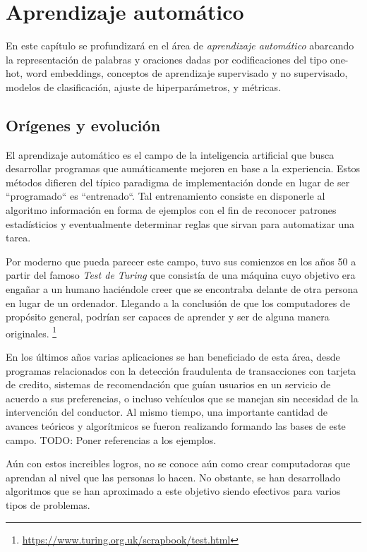 \chapter{Aprendizaje automático}

En este capítulo se profundizará en el área de \emph{aprendizaje automático}
abarcando la representación de palabras y oraciones dadas por codificaciones del
tipo one-hot, word embeddings, conceptos de aprendizaje supervisado y no
supervisado, modelos de clasificación, ajuste de hiperparámetros, y métricas.

\section{Orígenes y evolución}

El aprendizaje automático es el campo de la inteligencia artificial que busca
desarrollar programas que aumáticamente mejoren en base a la experiencia. Estos
métodos difieren del típico paradigma de implementación donde en lugar de ser
``programado`` es ``entrenado``. Tal entrenamiento consiste en disponerle al
algoritmo información en forma de ejemplos con el fin de reconocer patrones
estadísticios y eventualmente determinar reglas que sirvan para automatizar una
tarea.

Por moderno que pueda parecer este campo, tuvo sus comienzos en los años 50 a
partir del famoso \emph{Test de Turing} que consistía de una máquina cuyo
objetivo era engañar a un humano haciéndole creer que se encontraba delante de
otra persona en lugar de un ordenador. Llegando a la conclusión de que los
computadores de propósito general, podrían ser capaces de aprender y ser de
alguna manera originales.
\footnote{\url{https://www.turing.org.uk/scrapbook/test.html}}

En los últimos años varias aplicaciones se han beneficiado de esta área, desde
programas relacionados con la detección fraudulenta de transacciones con tarjeta
de credito, sistemas de recomendación que guían usuarios en un servicio de
acuerdo a sus preferencias, o incluso vehículos que se manejan sin necesidad de
la intervención del conductor. Al mismo tiempo, una importante cantidad de
avances teóricos y algorítmicos se fueron realizando formando las bases de este
campo. TODO: Poner referencias a los ejemplos.

Aún con estos increibles logros, no se conoce aún como crear computadoras que
aprendan al nivel que las personas lo hacen. No obstante, se han desarrollado
algoritmos que se han aproximado a este objetivo siendo efectivos para varios
tipos de problemas.

